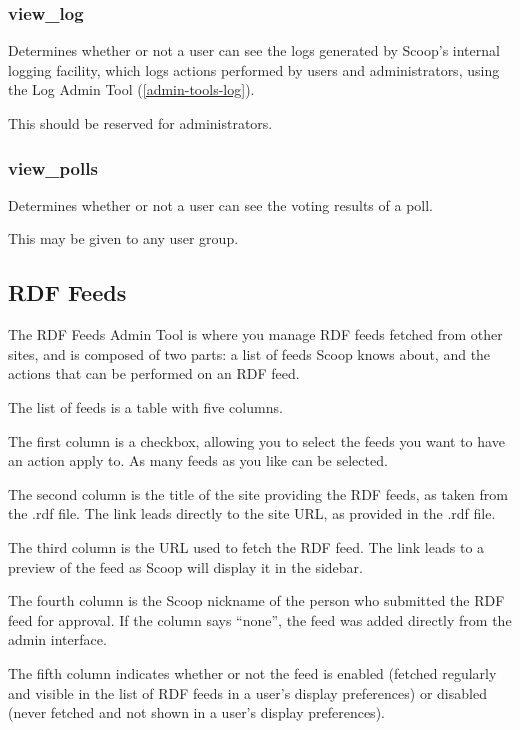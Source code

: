 \subsubsection{view\_log}
\label{perm-view-log}

Determines whether or not a user can see the logs generated by Scoop's internal logging facility, which logs actions performed by users and administrators, using the Log Admin Tool (\ref{admin-tools-log}).

This should be reserved for administrators.

\subsubsection{view\_polls}
\label{perm-view-polls}

Determines whether or not a user can see the voting results of a poll.

This may be given to any user group.



\subsection{RDF Feeds}
\label{admin-tools-rdf}

The RDF Feeds Admin Tool is where you manage RDF feeds fetched from other sites, and is composed of two parts: a list of feeds Scoop knows about, and the actions that can be performed on an RDF feed.

The list of feeds is a table with five columns.

The first column is a checkbox, allowing you to select the feeds you want to have an action apply to.  As many feeds as you like can be selected.

The second column is the title of the site providing the RDF feeds, as taken from the .rdf file.  The link leads directly to the site URL, as provided in the .rdf file.

The third column is the URL used to fetch the RDF feed.  The link leads to a preview of the feed as Scoop will display it in the sidebar.

The fourth column is the Scoop nickname of the person who submitted the RDF feed for approval.  If the column says ``none'', the feed was added directly from the admin interface.

The fifth column indicates whether or not the feed is enabled (fetched regularly and visible in the list of RDF feeds in a user's display preferences) or disabled (never fetched and not shown in a user's display preferences).

